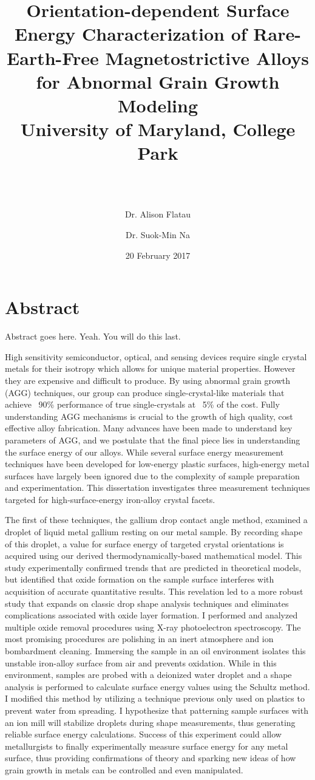 \documentclass[12pt,letterpaper]{report}
\title{
	{\textbf{Orientation-dependent Surface Energy Characterization of Rare-Earth-Free Magnetostrictive Alloys for Abnormal Grain Growth Modeling }}\\
	{\large University of Maryland, College Park}\\
}
\author{\makebox[.9\textwidth]{\textbf{Michael N. Van Order}\thanks{Funded by the \NSF SUSCHEM - Collaborative Research program (grant number: DMR-1310447)}}\\~\\
	\and Dr. Alison Flatau\\
	\and Dr. Suok-Min Na\\
}
\date{20 February 2017}
\begin{document}
	


\chapter*{Abstract}
Abstract goes here. Yeah. You will do this last. 

High sensitivity semiconductor, optical, and sensing devices require single crystal metals for their isotropy which allows for unique material properties. However they are expensive and difficult to produce. By using abnormal grain growth (AGG) techniques, our group can produce single-crystal-like materials that achieve ~90\% performance of true single-crystals at ~5\% of the cost. Fully understanding AGG mechanisms is crucial to the growth of high quality, cost effective alloy fabrication. Many advances have been made to understand key parameters of AGG, and we postulate that the final piece lies in understanding the surface energy of our alloys. While several surface energy measurement techniques have been developed for low-energy plastic surfaces, high-energy metal surfaces have largely been ignored due to the complexity of sample preparation and experimentation. This dissertation investigates three measurement techniques targeted for high-surface-energy iron-alloy crystal facets. \par
The first of these techniques, the gallium drop contact angle method, examined a droplet of liquid metal gallium resting on our metal sample. By recording shape of this droplet, a value for surface energy of targeted crystal orientations is acquired using our derived thermodynamically-based mathematical model. This study experimentally confirmed trends that are predicted in theoretical models, but identified that oxide formation on the sample surface interferes with acquisition of accurate quantitative results. This revelation led to a more robust study that expands on classic drop shape analysis techniques and eliminates complications associated with oxide layer formation. I performed and analyzed multiple oxide removal procedures using X-ray photoelectron spectroscopy. The most promising procedures are polishing in an inert atmosphere and ion bombardment cleaning. Immersing the sample in an oil environment isolates this unstable iron-alloy surface from air and prevents oxidation. While in this environment, samples are probed with a deionized water droplet and a shape analysis is performed to calculate surface energy values using the Schultz method. I modified this method by utilizing a technique previous only used on plastics to prevent water from spreading. I hypothesize that patterning sample surfaces with an ion mill will stabilize droplets during shape measurements, thus generating reliable surface energy calculations. Success of this experiment could allow metallurgists to finally experimentally measure surface energy for any metal surface, thus providing confirmations of theory and sparking new ideas of how grain growth in metals can be controlled and even manipulated. \par 
\end{document}
